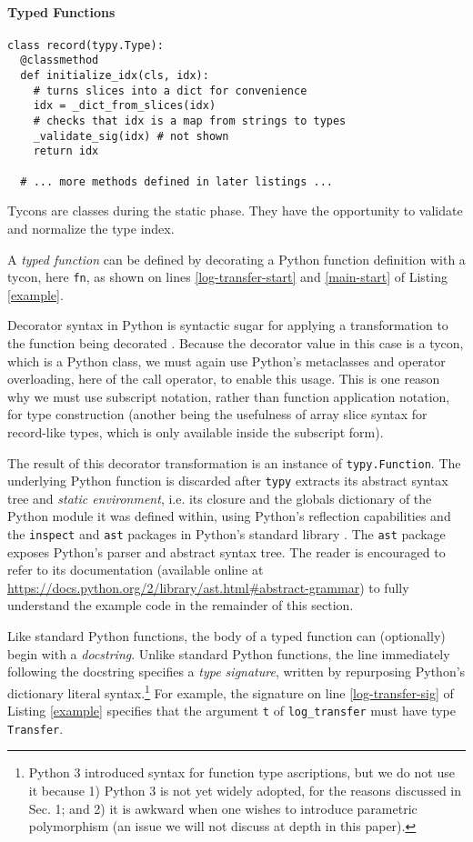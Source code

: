 \documentclass{sigplanconf}
\newcommand{\lip}[1]{\lstinline[language=Python,basicstyle=\ttfamily\small,deletendkeywords={tuple,buffer,map}]{#1}}
\begin{document}
\paragraph{Typed Functions}

\begin{codelisting}
\begin{lstlisting}
class record(typy.Type):
  @classmethod
  def initialize_idx(cls, idx):
    # turns slices into a dict for convenience
    idx = _dict_from_slices(idx)
    # checks that idx is a map from strings to types
    _validate_sig(idx) # not shown
    return idx

  # ... more methods defined in later listings ...
\end{lstlisting}
\caption{Tycons are classes during the static phase. They have the opportunity to validate and normalize the type index.}
\label{record_init}
\end{codelisting}

A \emph{typed function} can be defined by decorating a Python function definition with a tycon, here \lip{fn}, as shown on lines \ref{log-transfer-start} and \ref{main-start} of Listing \ref{example}. 

Decorator syntax in Python is syntactic sugar for applying a transformation to the function being decorated \cite{python}. Because the decorator value in this case is a tycon, which is a Python class, we must again use Python's  metaclasses and operator overloading, here of the call operator, to enable this usage. This is one reason why we must use subscript notation, rather than function application notation, for type construction (another being the usefulness of array slice syntax for record-like types, which is only available inside the subscript form). 

The result of this decorator transformation is  an instance of \lip{typy.Function}. The underlying Python function is discarded after \lip{typy} extracts its abstract syntax tree and \emph{static environment}, i.e. its closure and the globals dictionary of the Python module it was defined within, using Python's reflection capabilities and the \lip{inspect} and \lip{ast} packages in Python's standard library \cite{python}. The \lip{ast} package exposes Python's parser and abstract syntax tree. The reader is encouraged to refer to its documentation (available online at \url{https://docs.python.org/2/library/ast.html#abstract-grammar}) to fully understand the example code in the remainder of this section. 

Like standard Python functions, the body of a typed function can (optionally) begin with a \emph{docstring}. Unlike standard Python functions, the line immediately following the docstring specifies a \emph{type signature}, written by repurposing Python's dictionary literal syntax.\footnote{Python 3 introduced syntax for function type ascriptions, but we do not use it because 1) Python 3 is not yet widely adopted, for the reasons discussed in Sec. 1; and 2) it is awkward when one wishes to introduce parametric polymorphism (an issue we will not discuss at depth in this paper).} For example, the signature on line \ref{log-transfer-sig} of Listing \ref{example} specifies that the argument \lip{t} of \lip{log_transfer} must have type \lip{Transfer}. 
\end{document}
